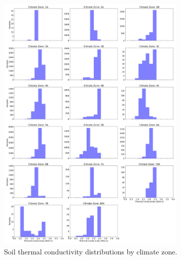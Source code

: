 \begin{figure} [ht!]
    \includegraphics[width=0.8\textwidth]{figures/soil_conductivity.png}
    \centering
    \caption[Soil thermal conductivity distributions by climate zone]{Soil thermal conductivity distributions by climate zone.}
    \label{fig:soil_conductivity}
\end{figure}
  
